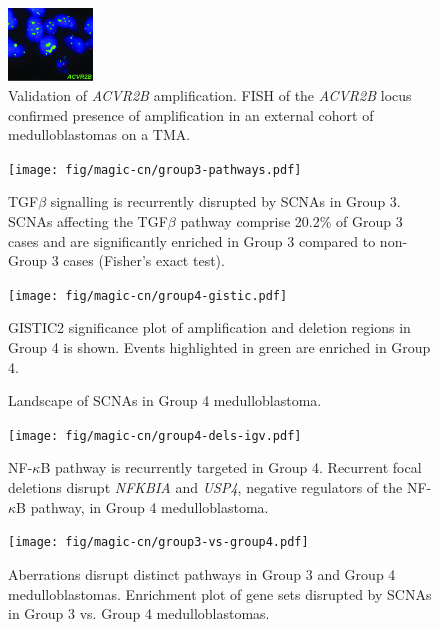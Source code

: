 \documentclass[11pt,letterpaper]{article}
\theoremstyle{definition}
\begin{document}
\begin{figure}
	\centering
	\includegraphics[width=0.2\textwidth]{fig/magic-cn/acvr2b-fish.jpg}
	\caption{Validation of \emph{ACVR2B} amplification.
	FISH of the \emph{ACVR2B} locus confirmed presence of amplification in an external cohort of medulloblastomas on a TMA.}
	\label{fig:acvr2b-fish}
\end{figure}

\begin{figure}
	\centering
	\texttt{[image: fig/magic-cn/group3-pathways.pdf]}
	\caption{TGF$\beta$ signalling is recurrently disrupted by SCNAs in Group 3.
SCNAs affecting the TGF$\beta$ pathway comprise 20.2\% of Group 3 cases and are significantly enriched in Group 3 compared to non-Group 3 cases (Fisher’s exact test).}
	\label{fig:group3-pathways}
\end{figure}

\clearpage

\begin{figure}[h]
	\begin{center}
		\texttt{[image: fig/magic-cn/group4-gistic.pdf]}
	\end{center}
	\caption{Landscape of SCNAs in Group 4 medulloblastoma.}
	GISTIC2 significance plot of amplification and deletion regions in Group 4 is shown. Events highlighted in green are enriched in Group 4.
	\label{fig:group4-gistic}
\end{figure}

\clearpage

\begin{figure}
	\centering
	\texttt{[image: fig/magic-cn/group4-dels-igv.pdf]}
	\caption{NF-$\kappa$B pathway is recurrently targeted in Group 4.
		Recurrent focal deletions disrupt \emph{NFKBIA} and \emph{USP4}, negative regulators of the NF-$\kappa$B pathway, in Group 4 medulloblastoma.}
	\label{fig:group4-del-igv}
\end{figure}

\begin{figure}
	\centering
	\texttt{[image: fig/magic-cn/group3-vs-group4.pdf]}
	\caption{Aberrations disrupt distinct pathways in Group 3 and Group 4 medulloblastomas.
	Enrichment plot of gene sets disrupted by SCNAs in Group 3 vs. Group 4 medulloblastomas.}
	\label{fig:group3-vs-group4}
\end{figure}
\end{document}
